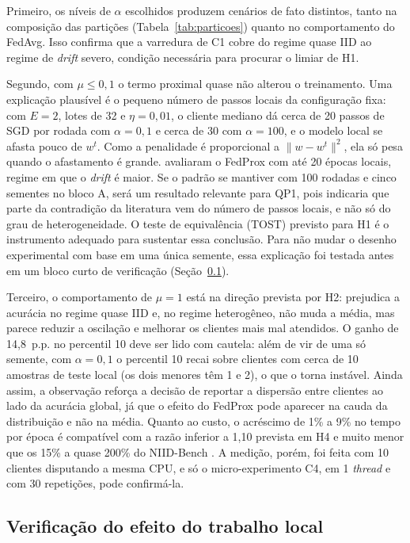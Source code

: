 Primeiro, os níveis de $\alpha$ escolhidos produzem cenários de fato distintos, tanto na composição das partições (Tabela~\ref{tab:particoes}) quanto no comportamento do FedAvg. Isso confirma que a varredura de C1 cobre do regime quase IID ao regime de \textit{drift} severo, condição necessária para procurar o limiar de H1.

Segundo, com $\mu \leq 0{,}1$ o termo proximal quase não alterou o treinamento. Uma explicação plausível é o pequeno número de passos locais da configuração fixa: com $E = 2$, lotes de 32 e $\eta = 0{,}01$, o cliente mediano dá cerca de 20 passos de SGD por rodada com $\alpha = 0{,}1$ e cerca de 30 com $\alpha = 100$, e o modelo local se afasta pouco de $w^t$. Como a penalidade é proporcional a $\lVert w - w^t\rVert^2$, ela só pesa quando o afastamento é grande. \citet{li2020fedprox} avaliaram o FedProx com até 20 épocas locais, regime em que o \textit{drift} é maior. Se o padrão se mantiver com 100 rodadas e cinco sementes no bloco A, será um resultado relevante para QP1, pois indicaria que parte da contradição da literatura vem do número de passos locais, e não só do grau de heterogeneidade. O teste de equivalência (TOST) previsto para H1 é o instrumento adequado para sustentar essa conclusão. Para não mudar o desenho experimental com base em uma única semente, essa explicação foi testada antes em um bloco curto de verificação (Seção~\ref{sec:gate}).

Terceiro, o comportamento de $\mu = 1$ está na direção prevista por H2: prejudica a acurácia no regime quase IID e, no regime heterogêneo, não muda a média, mas parece reduzir a oscilação e melhorar os clientes mais mal atendidos. O ganho de 14,8~p.p. no percentil 10 deve ser lido com cautela: além de vir de uma só semente, com $\alpha = 0{,}1$ o percentil 10 recai sobre clientes com cerca de 10 amostras de teste local (os dois menores têm 1 e 2), o que o torna instável. Ainda assim, a observação reforça a decisão de reportar a dispersão entre clientes ao lado da acurácia global, já que o efeito do FedProx pode aparecer na cauda da distribuição e não na média. Quanto ao custo, o acréscimo de 1\% a 9\% no tempo por época é compatível com a razão inferior a 1,10 prevista em H4 e muito menor que os 15\% a quase 200\% do NIID-Bench \citep{li2022niidbench}. A medição, porém, foi feita com 10 clientes disputando a mesma CPU, e só o micro-experimento C4, em 1 \textit{thread} e com 30 repetições, pode confirmá-la.

\subsection{Verificação do efeito do trabalho local}
\label{sec:gate}

